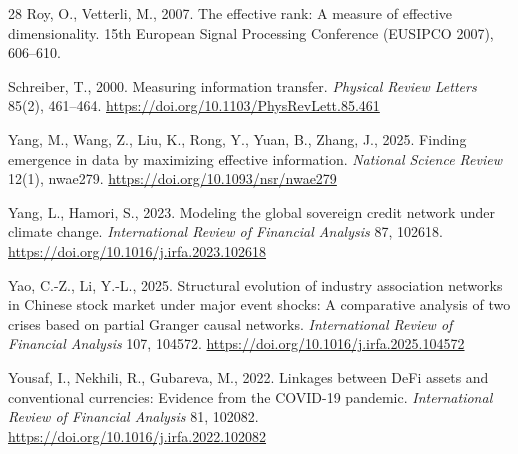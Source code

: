 \documentclass[12pt]{article}
\begin{document}
\begin{thebibliography}{28}
Roy, O., Vetterli, M., 2007.
\newblock The effective rank: A measure of effective dimensionality.
\newblock 15th European Signal Processing Conference (EUSIPCO 2007), 606--610.

Schreiber, T., 2000.
\newblock Measuring information transfer.
\newblock \emph{Physical Review Letters} 85(2), 461--464. \url{https://doi.org/10.1103/PhysRevLett.85.461}

Yang, M., Wang, Z., Liu, K., Rong, Y., Yuan, B., Zhang, J., 2025.
\newblock Finding emergence in data by maximizing effective information.
\newblock \emph{National Science Review} 12(1), nwae279. \url{https://doi.org/10.1093/nsr/nwae279}

Yang, L., Hamori, S., 2023.
\newblock Modeling the global sovereign credit network under climate change.
\newblock \emph{International Review of Financial Analysis} 87, 102618. \url{https://doi.org/10.1016/j.irfa.2023.102618}

Yao, C.-Z., Li, Y.-L., 2025.
\newblock Structural evolution of industry association networks in Chinese stock market under major event shocks: A comparative analysis of two crises based on partial Granger causal networks.
\newblock \emph{International Review of Financial Analysis} 107, 104572. \url{https://doi.org/10.1016/j.irfa.2025.104572}

Yousaf, I., Nekhili, R., Gubareva, M., 2022.
\newblock Linkages between DeFi assets and conventional currencies: Evidence from the COVID-19 pandemic.
\newblock \emph{International Review of Financial Analysis} 81, 102082. \url{https://doi.org/10.1016/j.irfa.2022.102082}
\end{thebibliography}
\end{document}
